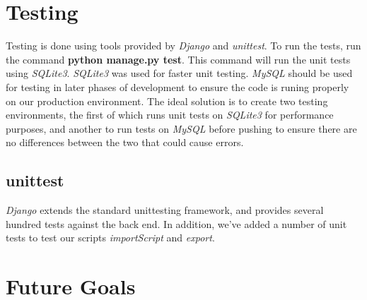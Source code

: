 \documentclass[12pt]{report}
\begin{document}
\section*{Testing}
\hfill


Testing is done using tools provided by \emph{Django} and \emph{unittest}.
To run the tests, run the command \textbf{python manage.py test}.
This command will run the unit tests using \emph{SQLite3}.
\emph{SQLite3} was used for faster unit testing.
\emph{MySQL} should be used for testing in later phases of development to ensure the code is runing properly on our production environment.
The ideal solution is to create two testing environments, the first of which runs unit tests on \emph{SQLite3} for performance purposes,
and another to run tests on \emph{MySQL} before pushing to ensure there are no differences between the two that could cause errors.


\subsection*{unittest}
\hfill


\emph{Django} extends the standard unittesting framework, and provides several hundred tests against the back end.
In addition, we've added a number of unit tests to test our scripts \emph{importScript} and \emph{export}.


\section*{Future Goals}
\end{document}
